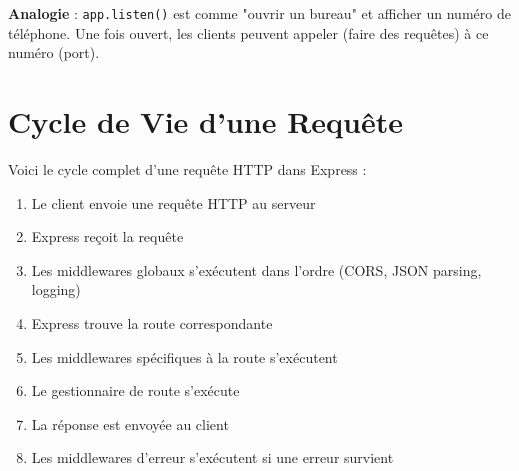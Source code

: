 \begin{analogybox}
    \textbf{Analogie} : \texttt{app.listen()} est comme "ouvrir un bureau" et afficher un numéro de téléphone. Une fois ouvert, les clients peuvent appeler (faire des requêtes) à ce numéro (port).
\end{analogybox}

\section{Cycle de Vie d'une Requête}

Voici le cycle complet d'une requête HTTP dans Express :

\begin{enumerate}
    \item Le client envoie une requête HTTP au serveur
    \item Express reçoit la requête
    \item Les middlewares globaux s'exécutent dans l'ordre (CORS, JSON parsing, logging)
    \item Express trouve la route correspondante
    \item Les middlewares spécifiques à la route s'exécutent
    \item Le gestionnaire de route s'exécute
    \item La réponse est envoyée au client
    \item Les middlewares d'erreur s'exécutent si une erreur survient
\end{enumerate}

\begin{center}
\end{center}

